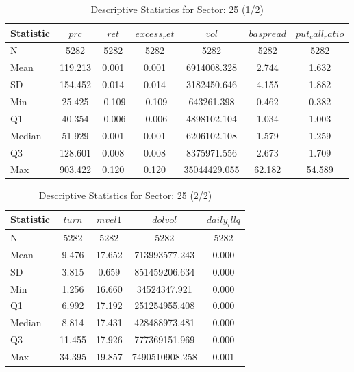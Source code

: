     \begin{table}[ht]
    \centering

    
    \caption{Descriptive Statistics for Sector: 25 (1/2)}
    \label{tab:sec25_a}
    
    \begin{tabular}{lcccccc}
    \toprule
    Statistic & $prc$ & $ret$ & $excess_ret$ & $vol$ & $baspread$ & $put_call_ratio$ \\\midrule
    N & 5282 & 5282 & 5282 & 5282 & 5282 & 5282 \\
    Mean & 119.213 & 0.001 & 0.001 & 6914008.328 & 2.744 & 1.632 \\
    SD & 154.452 & 0.014 & 0.014 & 3182450.646 & 4.155 & 1.882 \\
    Min & 25.425 & -0.109 & -0.109 & 643261.398 & 0.462 & 0.382 \\
    Q1 & 40.354 & -0.006 & -0.006 & 4898102.104 & 1.034 & 1.003 \\
    Median & 51.929 & 0.001 & 0.001 & 6206102.108 & 1.579 & 1.259 \\
    Q3 & 128.601 & 0.008 & 0.008 & 8375971.556 & 2.673 & 1.709 \\
    Max & 903.422 & 0.120 & 0.120 & 35044429.055 & 62.182 & 54.589 \\
    \bottomrule
    \end{tabular}

    \end{table}
    
    \begin{table}[ht]
    \centering

    
    \caption{Descriptive Statistics for Sector: 25 (2/2)}
    \label{tab:sec25_b}
    
    \begin{tabular}{lcccc}
    \toprule
    Statistic & $turn$ & $mvel1$ & $dolvol$ & $daily_illq$ \\\midrule
    N & 5282 & 5282 & 5282 & 5282 \\
    Mean & 9.476 & 17.652 & 713993577.243 & 0.000 \\
    SD & 3.815 & 0.659 & 851459206.634 & 0.000 \\
    Min & 1.256 & 16.660 & 34524347.921 & 0.000 \\
    Q1 & 6.992 & 17.192 & 251254955.408 & 0.000 \\
    Median & 8.814 & 17.431 & 428488973.481 & 0.000 \\
    Q3 & 11.455 & 17.926 & 777369151.969 & 0.000 \\
    Max & 34.395 & 19.857 & 7490510908.258 & 0.001 \\
    \bottomrule
    \end{tabular}

    \end{table}
    

